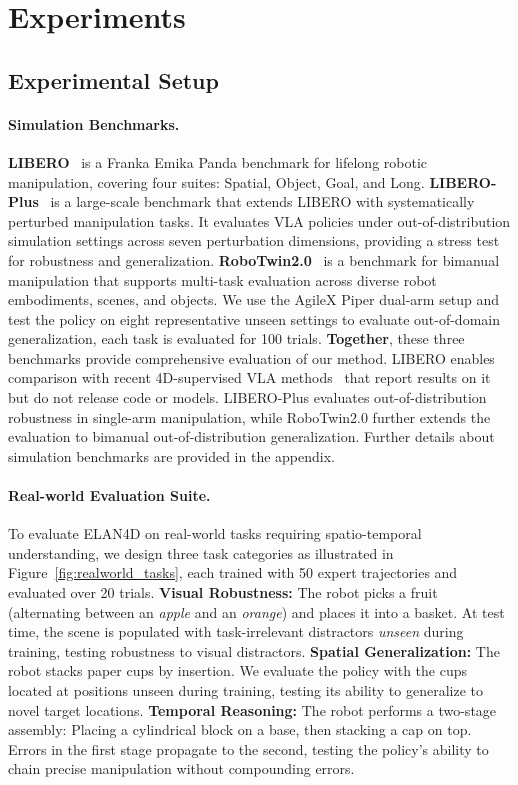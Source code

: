 \section{Experiments}
\subsection{Experimental Setup}
\paragraph{Simulation Benchmarks.}
\textbf{LIBERO}~\citep{liu2023libero} is a Franka Emika Panda benchmark for
lifelong robotic manipulation, covering four suites: Spatial, Object, Goal, and
Long.
\textbf{LIBERO-Plus}~\citep{fei2025liberoplus} is a large-scale  benchmark
that extends LIBERO with systematically perturbed manipulation tasks. It
evaluates VLA policies under out-of-distribution simulation settings across
seven perturbation dimensions, providing a stress test for robustness and
generalization.
\textbf{RoboTwin2.0}~\citep{chen2025robotwin} is a benchmark for bimanual
manipulation that supports multi-task evaluation across diverse robot
embodiments, scenes, and objects. We use the AgileX Piper dual-arm setup and
test the policy on eight representative unseen settings to evaluate out-of-domain generalization, each task is evaluated for 100 trials. \textbf{Together}, these three benchmarks provide comprehensive evaluation of our method. LIBERO
enables comparison with recent 4D-supervised VLA methods~\citep{qian2025geopredict, kim2026pri4rlearningworlddynamics} that report results on
it but do not release code or models. LIBERO-Plus evaluates
out-of-distribution robustness in single-arm manipulation, while RoboTwin2.0
further extends the evaluation to bimanual out-of-distribution generalization. Further details about simulation benchmarks are provided in the appendix.\vspace{-1em}

\paragraph{Real-world Evaluation Suite.}
To evaluate ELAN4D on real-world tasks requiring 
spatio-temporal understanding, we design three task categories as illustrated in Figure~\ref{fig:realworld_tasks}, 
each trained with 50 expert trajectories and evaluated over 20 
trials.
\textbf{Visual Robustness:} The robot picks a fruit (alternating 
between an \emph{apple} and an \emph{orange}) and places it into a basket. At test time, the scene is populated with task-irrelevant distractors \emph{unseen} during training, testing robustness to visual distractors.
\textbf{Spatial Generalization:} The robot stacks paper cups by 
insertion. We evaluate the policy with the cups located at positions unseen during training, testing its ability to generalize to novel target locations.
\textbf{Temporal Reasoning:} The robot performs a two-stage 
assembly: Placing a cylindrical block on a base, then stacking a 
cap on top. Errors in the first stage propagate to the second, 
testing the policy's ability to chain precise manipulation without compounding errors.\vspace{-1em}

